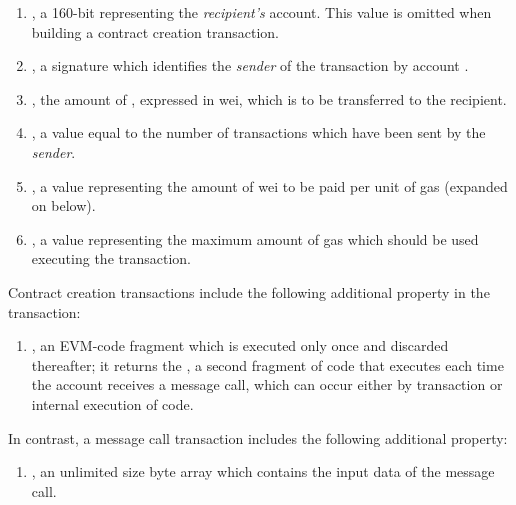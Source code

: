 \begin{enumerate}
  \item {}, a 160-bit  representing the \emph{recipient's}
    account. This value is omitted when building a contract creation
    transaction.

  \item {}, a signature which identifies the \emph{sender} of the
    transaction by account .\footnotemark{}


  \item {}, the amount of , expressed in wei, which is
    to be transferred to the recipient.

  \item {}, a value equal to the number of transactions which have been
    sent by the \emph{sender}.

  \item {}, a value representing the amount of wei to be paid per
    unit of gas (expanded on below).

  \item {}, a value representing the maximum amount of gas which
    should be used executing the transaction.
\end{enumerate}

Contract creation transactions include the following additional property in the
transaction:

\begin{enumerate}
  \item {}, an EVM-code fragment which is executed only once and
    discarded thereafter; it returns the , a second fragment of code
    that executes each time the account receives a message call, which can occur
    either by transaction or internal execution of code.
\end{enumerate}

In contrast, a message call transaction includes the following additional
property:

\begin{enumerate}
  \item {}, an unlimited size byte array which contains the input data
    of the message call.
\end{enumerate}

